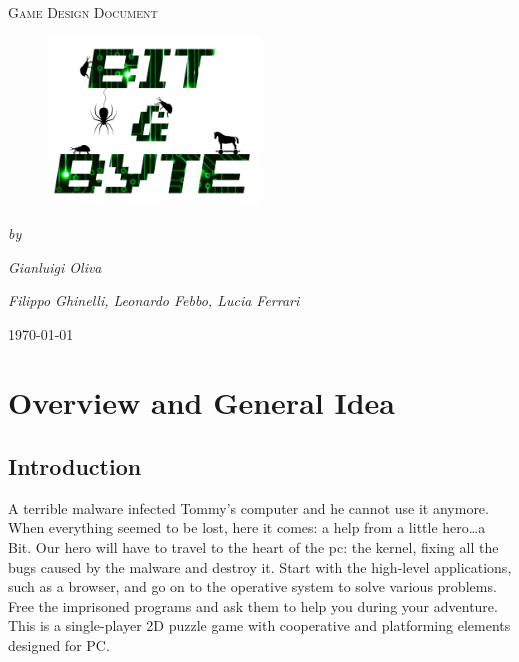 \documentclass[12pt, a4paper]{report}
\begin{document}
\begin{titlepage}
	\centering
	\vspace{1cm}
	\vspace{1cm}

	{\scshape\Large Game Design Document\par}
	\vspace{0.1cm}
	\begin{figure}[H]
		\centering
		\includegraphics[width=0.5\textwidth]{images/Logo}
	\end{figure}
	\vspace{1cm}
	\vspace{3cm}
	{\Large\itshape by\par}
	{\Large\itshape Gianluigi Oliva\par}
	{\Large\itshape Filippo Ghinelli, Leonardo Febbo, Lucia Ferrari\par}
	\vspace{1.5cm}
	\vfill
	


	\vfill

	{\large \today\par}
\end{titlepage}

\newpage
\tableofcontents
\newpage

\chapter{Overview and General Idea}
\section*{Introduction}
A terrible malware infected Tommy’s computer and he cannot use it anymore. When everything seemed to be lost, here it comes: a help from a little hero…a Bit. Our hero will have to travel to the heart of the pc: the kernel, fixing all the bugs caused by the malware and destroy it. Start with the high-level applications, such as a browser, and go on to the operative system to solve various problems. Free the imprisoned programs and ask them to help you during your adventure.\\
This is a single-player 2D puzzle game with cooperative and platforming elements designed for PC.
\end{document}
